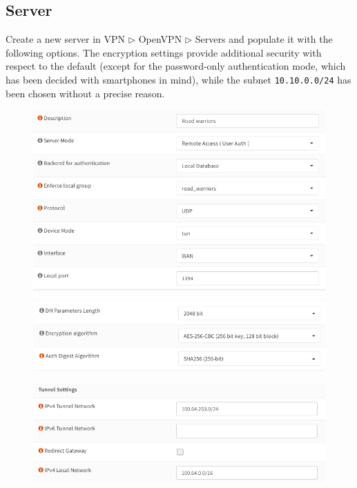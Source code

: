 \documentclass{homework}
\begin{document}
    \subsection{Server}
    Create a new server in VPN $\triangleright$ OpenVPN $\triangleright$ Servers and populate it with the following options.
    The encryption settings provide additional security with respect to the default (except for the password-only authentication mode, which has been decided with smartphones in mind), while the subnet \texttt{10.10.0.0/24} has been chosen without a precise reason.
    \begin{figure}[H]
        \centering
        \includegraphics[width=\linewidth]{openvpn/settings-general}
        \label{fig:openvpn-settings-general}
    \end{figure}
    \vspace{-20pt}
    \begin{figure}[H]
        \centering
        \includegraphics[width=\linewidth]{openvpn/settings-security}
        \label{fig:openvpn-settings-security}
    \end{figure}
    \vspace{-20pt}
    \begin{figure}[H]
        \centering
        \includegraphics[width=\linewidth]{openvpn/settings-tunnel}
        \label{fig:openvpn-settings-tunnel}
    \end{figure}
    \vspace{-20pt}
    
\end{document}
